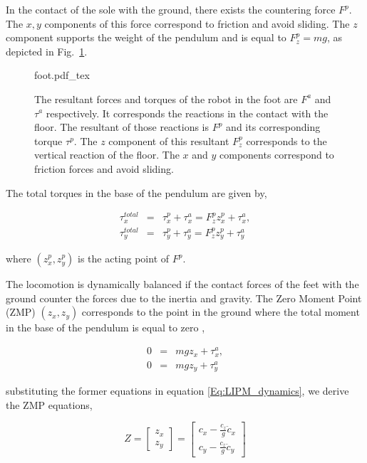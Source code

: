 In the contact of the sole with the ground, there exists the countering force $F^p$. The $x,y$ components of this force correspond to friction and avoid sliding. The $z$ component supports the weight of the pendulum and is equal to $F^p_z = mg$, as depicted in Fig.~\ref{Fig:Foot-Sole}.

\begin{figure}
  \centering
      {\def\svgwidth{0.5\columnwidth}
        
                   {foot.pdf_tex}}
      \caption[]{The resultant forces and torques of the robot in the foot are $F^a$ and $\tau^a$ respectively. It corresponds the reactions in the contact with the floor. The resultant of those reactions is $F^p$ and its corresponding torque $\tau^p$. The $z$ component of this resultant $F^p_z$ corresponds to the vertical reaction of the floor. The $x$ and $y$ components correspond to friction forces and avoid sliding.}
      \label{Fig:Foot-Sole}
\end{figure}

The total torques in the base of the pendulum are given by,

\begin{eqnarray*}
\label{Eq:LIPM_total_torques}
\tau^{total}_{x} &=& \tau^p_x + \tau^a_x = F^p_z z^p_x + \tau^a_x, \\
\tau^{total}_{y} &=& \tau^p_y + \tau^a_y = F^p_z z^p_y + \tau^a_y
\end{eqnarray*}

where $(z^p_x, z^p_y)$ is the acting point of $F^p$.

The locomotion is dynamically balanced if the contact forces of the feet with the ground counter the forces due to the inertia and gravity. The Zero Moment Point (ZMP) $(z_x,z_y)$ corresponds to the point in the ground where the total moment in the base of the pendulum is equal to zero \citep{Vukobratovic1972,Vukobratovic2004},

\begin{eqnarray}
0 &=& m g z_x + \tau^a_x, \\
0 &=& m g z_y + \tau^a_y
\end{eqnarray}

substituting the former equations in equation \ref{Eq:LIPM_dynamics}, we derive the ZMP equations,

\begin{equation}
\label{Eq:LIPM_ZMP}
Z = 
\left[
\begin{matrix}
z_x \\ z_y
\end{matrix}
\right] = 
\left[
\begin{matrix}
c_x - \frac{c_z}{g}\ddot{c}_x \\ c_y - \frac{c_z}{g}\ddot{c}_y
\end{matrix}
\right]
\end{equation}

